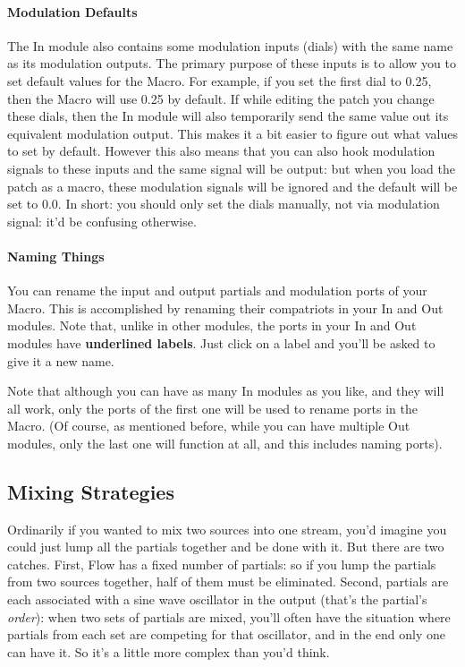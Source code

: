 \documentclass{article}
\newcommand\name{Flow}
\begin{document}
\paragraph{Modulation Defaults}

The In module also contains some modulation inputs (dials) with the same name as its modulation outputs.  The primary purpose of these inputs is to allow you to set default values for the Macro.   For example, if you set the first dial to 0.25, then the Macro will use 0.25 by default.  If while editing the patch you change these dials, then the In module will also temporarily send the same value out its equivalent modulation output.  This makes it a bit easier to figure out what values to set by default.  However this also means that you can also hook modulation signals to these inputs and the same signal will be output: but when you load the patch as a macro, these modulation signals will be ignored and the default will be set to 0.0.  In short: you should only set the dials manually, not via modulation signal: it'd be confusing otherwise.

\paragraph{Naming Things}

You can rename the input and output partials and modulation ports of your Macro.  This is accomplished by renaming their compatriots in your In and Out modules.  Note that, unlike in other modules, the ports in your In and Out modules have {\bf underlined labels}.  Just click on a label and you'll be asked to give it a new name.

Note that although you can have as many In modules as you like, and they will all work, only the ports of the first one will be used to rename ports in the Macro.  (Of course, as mentioned before, while you can have multiple Out modules, only the last one will function at all, and this includes naming ports).

\subsection{Mixing Strategies}
\label{mixingstrategies}

Ordinarily if you wanted to mix two sources into one stream, you'd imagine you could just lump all the partials together and be done with it.  But there are two catches.  First, {\name} has a fixed number of partials: so if you lump the partials from two sources together, half of them must be eliminated.  Second, partials are each associated with a sine wave oscillator in the output (that's the partial's {\it order}): when two sets of partials are mixed, you'll often have the situation where partials from each set are competing for that oscillator, and in the end only one can have it.  So it's a little more complex than you'd think.
\end{document}

